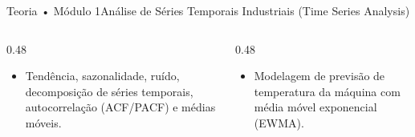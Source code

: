 \begin{senaiframe}{Teoria • Módulo 1}{Análise de Séries Temporais Industriais (Time Series Analysis)}
  \begin{columns}[t]
    \begin{column}{0.48\textwidth}
      \begin{tcolorbox}[senaibluecard, title={Fundamentos Teóricos}]
        \begin{itemize}
          \item Tendência, sazonalidade, ruído, decomposição de séries temporais, autocorrelação (ACF/PACF) e médias móveis.
        \end{itemize}
      \end{tcolorbox}
    \end{column}
    \begin{column}{0.48\textwidth}
      \begin{tcolorbox}[senaigreencard, title={Prática \& Laboratório}]
        \begin{itemize}
          \item Modelagem de previsão de temperatura da máquina com média móvel exponencial (EWMA).
        \end{itemize}
      \end{tcolorbox}
    \end{column}
  \end{columns}
\end{senaiframe}
